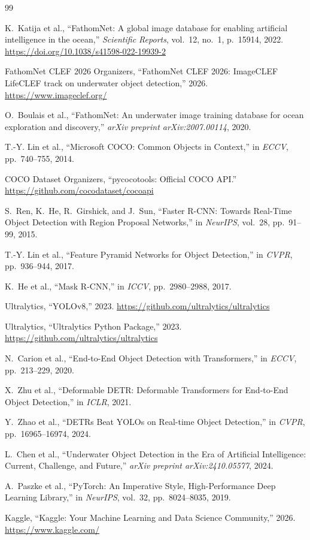 \documentclass[11pt,a4paper]{article}
\begin{document}
\begin{thebibliography}{99}

K.~Katija et al., ``FathomNet: A global image database for enabling artificial intelligence in the ocean,'' \emph{Scientific Reports}, vol.~12, no.~1, p.~15914, 2022. \url{https://doi.org/10.1038/s41598-022-19939-2}

FathomNet CLEF 2026 Organizers, ``FathomNet CLEF 2026: ImageCLEF LifeCLEF track on underwater object detection,'' 2026. \url{https://www.imageclef.org/}

O.~Boulais et al., ``FathomNet: An underwater image training database for ocean exploration and discovery,'' \emph{arXiv preprint arXiv:2007.00114}, 2020.

T.-Y. Lin et al., ``Microsoft COCO: Common Objects in Context,'' in \emph{ECCV}, pp.~740--755, 2014.

COCO Dataset Organizers, ``pycocotools: Official COCO API.'' \url{https://github.com/cocodataset/cocoapi}

S.~Ren, K.~He, R.~Girshick, and J.~Sun, ``Faster R-CNN: Towards Real-Time Object Detection with Region Proposal Networks,'' in \emph{NeurIPS}, vol.~28, pp.~91--99, 2015.

T.-Y. Lin et al., ``Feature Pyramid Networks for Object Detection,'' in \emph{CVPR}, pp.~936--944, 2017.

K.~He et al., ``Mask R-CNN,'' in \emph{ICCV}, pp.~2980--2988, 2017.

Ultralytics, ``YOLOv8,'' 2023. \url{https://github.com/ultralytics/ultralytics}

Ultralytics, ``Ultralytics Python Package,'' 2023. \url{https://github.com/ultralytics/ultralytics}

N.~Carion et al., ``End-to-End Object Detection with Transformers,'' in \emph{ECCV}, pp.~213--229, 2020.

X.~Zhu et al., ``Deformable DETR: Deformable Transformers for End-to-End Object Detection,'' in \emph{ICLR}, 2021.

Y.~Zhao et al., ``DETRs Beat YOLOs on Real-time Object Detection,'' in \emph{CVPR}, pp.~16965--16974, 2024.

L.~Chen et al., ``Underwater Object Detection in the Era of Artificial Intelligence: Current, Challenge, and Future,'' \emph{arXiv preprint arXiv:2410.05577}, 2024.

A.~Paszke et al., ``PyTorch: An Imperative Style, High-Performance Deep Learning Library,'' in \emph{NeurIPS}, vol.~32, pp.~8024--8035, 2019.

Kaggle, ``Kaggle: Your Machine Learning and Data Science Community,'' 2026. \url{https://www.kaggle.com/}

\end{thebibliography}
\end{document}
